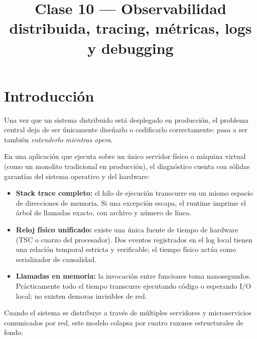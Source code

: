 \documentclass[variant=apuntes,cover=institutional,mode=screen]{ua-engineering-v6-article}
\title{Clase 10 --- Observabilidad distribuida, tracing, métricas, logs y debugging}
\author{\UAProfessor}
\date{\UADate}
\begin{document}
\sloppy
\maketitle

\section{Introducción}

Una vez que un sistema distribuido está desplegado en producción, el problema central deja de ser únicamente diseñarlo o codificarlo correctamente: pasa a ser también \emph{entenderlo mientras opera}.

En una aplicación que ejecuta sobre un único servidor físico o máquina virtual (como un monolito tradicional en producción), el diagnóstico cuenta con sólidas garantías del sistema operativo y del hardware:
\begin{itemize}
\item \textbf{Stack trace completo:} el hilo de ejecución transcurre en un mismo espacio de direcciones de memoria. Si una excepción escapa, el runtime imprime el árbol de llamadas exacto, con archivo y número de línea.
\item \textbf{Reloj físico unificado:} existe una única fuente de tiempo de hardware (TSC o cuarzo del procesador). Dos eventos registrados en el log local tienen una relación temporal estricta y verificable; el tiempo físico actúa como serializador de causalidad.
\item \textbf{Llamadas en memoria:} la invocación entre funciones toma nanosegundos. Prácticamente todo el tiempo transcurre ejecutando código o esperando I/O local; no existen demoras invisibles de red.
\end{itemize}

Cuando el sistema se distribuye a través de múltiples servidores y microservicios comunicados por red, este modelo colapsa por cuatro razones estructurales de fondo:
\end{document}
